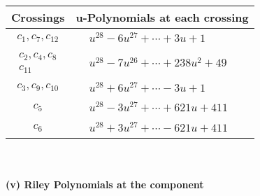 \documentclass[1p]{elsarticle_modified}
\theoremstyle{definition}
\begin{document}
\begin{tabular}{m{50pt}|m{274pt}}
Crossings & \hspace{64pt}u-Polynomials at each crossing \\
\hline $$\begin{aligned}c_{1},c_{7},c_{12}\end{aligned}$$&$\begin{aligned}
&u^{28}-6 u^{27}+\cdots+3 u+1
\end{aligned}$\\
\hline $$\begin{aligned}c_{2},c_{4},c_{8}\\c_{11}\end{aligned}$$&$\begin{aligned}
&u^{28}-7 u^{26}+\cdots+238 u^2+49
\end{aligned}$\\
\hline $$\begin{aligned}c_{3},c_{9},c_{10}\end{aligned}$$&$\begin{aligned}
&u^{28}+6 u^{27}+\cdots-3 u+1
\end{aligned}$\\
\hline $$\begin{aligned}c_{5}\end{aligned}$$&$\begin{aligned}
&u^{28}-3 u^{27}+\cdots+621 u+411
\end{aligned}$\\
\hline $$\begin{aligned}c_{6}\end{aligned}$$&$\begin{aligned}
&u^{28}+3 u^{27}+\cdots-621 u+411
\end{aligned}$\\
\hline
\end{tabular}\\~\\
\newpage\renewcommand{\arraystretch}{1}
\flushleft \textbf{(v) Riley Polynomials at the component}\newline \\
\end{document}
